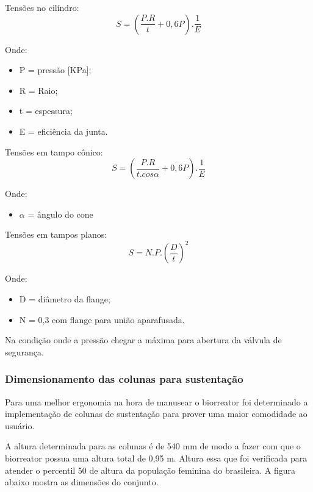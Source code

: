 Tensões no cilíndro:
\[S = (\frac{P.R}{t}+0,6P). \frac{1}{E}\]

Onde:

\begin{itemize}
	\item P = pressão [KPa];
	\item R = Raio;
	\item t = espessura;
	\item E = eficiência da junta.
\end{itemize}

Tensões em tampo cônico:
\[S = \left(\frac{P.R}{t.cos\alpha}+0,6P\right). \frac{1}{E}\]

Onde:
\begin{itemize}
	\item \(\alpha\) = ângulo do cone
\end{itemize}

Tensões em tampos planos:
\[S=N.P.\left(\frac{D}{t}\right)^2\]

Onde:
\begin{itemize}
	\item D = diâmetro da flange;
	\item N = 0,3 com flange para união aparafusada.
\end{itemize}

Na condição onde a pressão chegar a máxima para abertura da válvula de segurança.

\subsubsection{Dimensionamento das colunas para sustentação}

Para uma melhor ergonomia na hora de manusear o biorreator foi determinado a implementação de colunas de sustentação para prover uma maior comodidade ao usuário.

A altura determinada para as colunas é de 540 mm de modo a fazer com que o biorreator possua uma altura total de 0,95 m. Altura essa que foi verificada para atender o percentil 50 de altura da população feminina do brasileira. A figura abaixo mostra as dimensões do conjunto.


